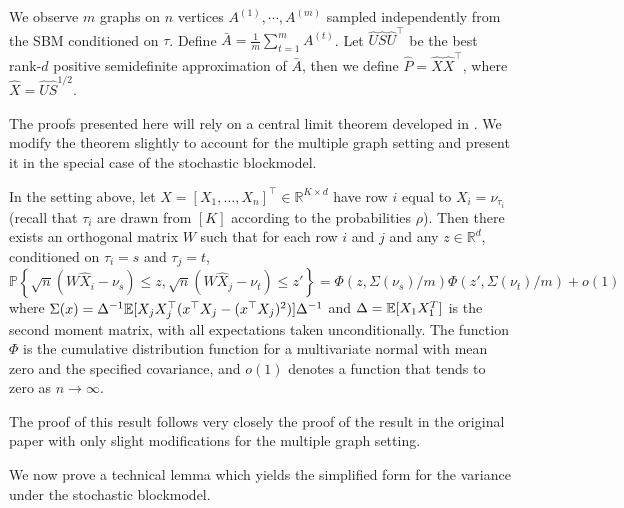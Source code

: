 We observe $m$ graphs on $n$ vertices $A^{(1)}, \cdots, A^{(m)}$ sampled independently from the SBM conditioned on $\tau$.
Define $\bar{A} = \frac{1}{m} \sum_{t=1}^m A^{(t)}$. Let $\hat{U} \hat{S} \hat{U}^{\top}$ be the best rank-$d$ positive semidefinite approximation of $\bar{A}$, then we define $\hat{P} = \hat{X} \hat{X}^{\top}$, where $\hat{X} = \hat{U} \hat{S}^{1/2}$.

The proofs presented here will rely on a central limit theorem developed in \citet{athreya2016limit}. 
We modify the theorem slightly to account for the multiple graph setting and present it in the special case of the stochastic blockmodel.

\begin{theorem}
\label{thm:clt_ext}
  In the setting above, let $X=[X_1,\dotsc,X_n]^{\top} \in \mathbb{R}^{K \times d}$ have row $i$ equal to $X_i=\nu_{\tau_i}$ (recall that $\tau_i$ are drawn from $[K]$ according to the probabilities $\rho$).
	Then there exists an orthogonal matrix $W$ such that for each row $i$ and $j$ and any $z \in \mathbb{R}^{d}$, conditioned on $\tau_i=s$ and $\tau_j=t$,
  \begin{equation}
    \label{eq:4}
    \mathbb{P}\left\{\sqrt{n}( W \hat{X}_i - \nu_s ) \leq z, \sqrt{n}( W \hat{X}_j - \nu_t) \leq z'\right\}
=  \Phi(z, \Sigma(\nu_s)/m)  \Phi(z', \Sigma(\nu_t)/m) +o(1)
  \end{equation}
  where $\Sigma(x) =\Delta^{-1}\mathbb{E}[ X_j X_j^\top(x^\top X_j -(x^\top
  X_j)^2)]\Delta^{-1}$ and $\Delta=\mathbb{E}[ X_1 X_{1}^{T}]$ is the second
  moment matrix, with all expectations taken unconditionally.
  The function $\Phi$ is the cumulative distribution function for a multivariate normal with mean zero and the specified covariance, and $o(1)$ denotes a function that tends to zero as $n \to \infty$.
\end{theorem}
The proof of this result follows very closely the proof of the result in the original paper with only slight modifications for the multiple graph setting.

We now prove a technical lemma which yields the simplified form for the variance under the stochastic blockmodel.

